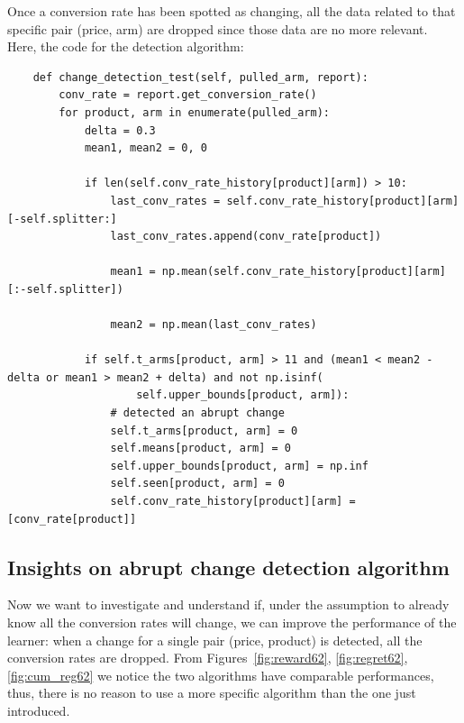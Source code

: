 Once a conversion rate has been spotted as changing, all the data related to that specific pair (price, arm) are dropped since those data are no more relevant.\\
Here, the code for the detection algorithm:
\begin{verbatim}
    def change_detection_test(self, pulled_arm, report):
        conv_rate = report.get_conversion_rate()
        for product, arm in enumerate(pulled_arm):
            delta = 0.3
            mean1, mean2 = 0, 0

            if len(self.conv_rate_history[product][arm]) > 10:
                last_conv_rates = self.conv_rate_history[product][arm][-self.splitter:]
                last_conv_rates.append(conv_rate[product])

                mean1 = np.mean(self.conv_rate_history[product][arm][:-self.splitter])

                mean2 = np.mean(last_conv_rates)

            if self.t_arms[product, arm] > 11 and (mean1 < mean2 - delta or mean1 > mean2 + delta) and not np.isinf(
                    self.upper_bounds[product, arm]):
                # detected an abrupt change
                self.t_arms[product, arm] = 0
                self.means[product, arm] = 0
                self.upper_bounds[product, arm] = np.inf
                self.seen[product, arm] = 0
                self.conv_rate_history[product][arm] = [conv_rate[product]]
\end{verbatim}
\subsection{Insights on abrupt change detection algorithm}
\label{learner1}
Now we want to investigate and understand if, under the assumption to already know all the conversion rates will change, we can improve the performance of the learner: when a change for a single pair (price, product) is detected, all the conversion rates are dropped. From Figures~\ref{fig:reward62}, \ref{fig:regret62}, \ref{fig:cum_reg62} we notice the two algorithms have comparable performances, thus, there is no reason to use a more specific algorithm than the one just introduced.

